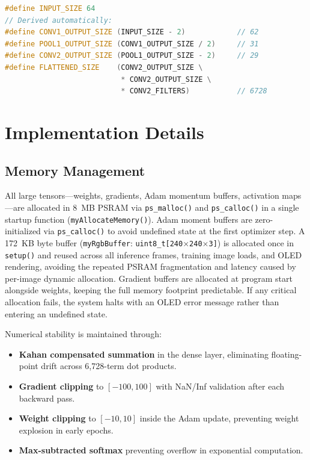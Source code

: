 \documentclass[12pt]{article}
\begin{document}
\begin{lstlisting}[language=C++]
#define INPUT_SIZE 64
// Derived automatically:
#define CONV1_OUTPUT_SIZE (INPUT_SIZE - 2)            // 62
#define POOL1_OUTPUT_SIZE (CONV1_OUTPUT_SIZE / 2)     // 31
#define CONV2_OUTPUT_SIZE (POOL1_OUTPUT_SIZE - 2)     // 29
#define FLATTENED_SIZE    (CONV2_OUTPUT_SIZE \
                           * CONV2_OUTPUT_SIZE \
                           * CONV2_FILTERS)           // 6728
\end{lstlisting}

\section{Implementation Details}
\label{sec:implementation}

\subsection{Memory Management}
\label{subsec:memory}

All large tensors---weights, gradients, Adam momentum buffers, activation
maps---are allocated in 8~MB PSRAM via \texttt{ps\_malloc()} and
\texttt{ps\_calloc()} in a single startup function (\texttt{myAllocateMemory()}).
Adam moment buffers are zero-initialized via \texttt{ps\_calloc()} to avoid
undefined state at the first optimizer step.
A 172~KB byte buffer (\texttt{myRgbBuffer}: \texttt{uint8\_t[240$\times$240$\times$3]})
is allocated once in \texttt{setup()} and reused across all inference frames,
training image loads, and OLED rendering, avoiding the repeated PSRAM
fragmentation and latency caused by per-image dynamic allocation.
Gradient buffers are allocated at program start alongside weights, keeping the
full memory footprint predictable.
If any critical allocation fails, the system halts with an OLED error message
rather than entering an undefined state.

Numerical stability is maintained through:
\begin{itemize}[nosep]
  \item \textbf{Kahan compensated summation} in the dense layer, eliminating
        floating-point drift across 6{,}728-term dot products.
  \item \textbf{Gradient clipping} to $[-100, 100]$ with NaN/Inf validation
        after each backward pass.
  \item \textbf{Weight clipping} to $[-10, 10]$ inside the Adam update,
        preventing weight explosion in early epochs.
  \item \textbf{Max-subtracted softmax} preventing overflow in exponential
        computation.
\end{itemize}
\end{document}
